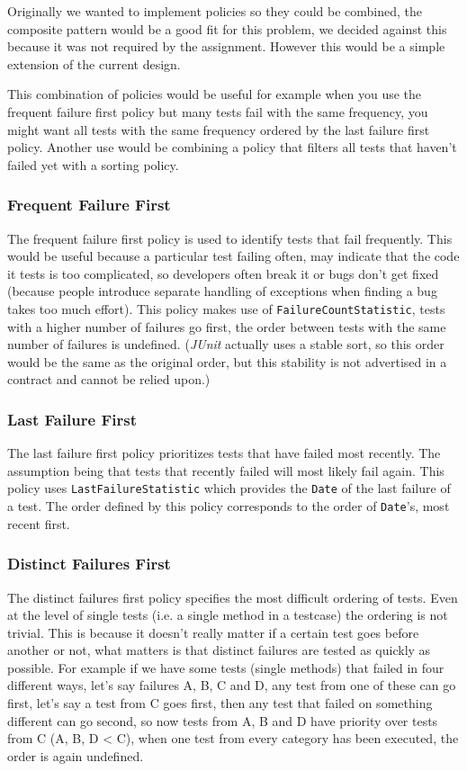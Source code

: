 \documentclass[i2]{oss}
\newcommand{\class}[1]{\texttt{#1}}
\newcommand{\junit}{\emph{JUnit }}
\begin{document}
Originally we wanted to implement policies so they could be combined,
the composite pattern would be a good fit for this problem,
we decided against this because it was not required by the assignment.
However this would be a simple extension of the current design.

This combination of policies would be useful for example when you use
the frequent failure first policy but many tests fail with the
same frequency, you might want all tests with the same frequency ordered
by the last failure first policy.
Another use would be combining a policy that filters all tests that 
haven't failed yet with a sorting policy.

\subsubsection{Frequent Failure First}

The frequent failure first policy is used to identify tests that fail
frequently.
This would be useful because a particular test failing often, may 
indicate that the code it tests is too complicated, so developers often 
break it or bugs don't get fixed (because people introduce separate 
handling of exceptions when finding a bug takes too much effort).
This policy makes use of \class{FailureCountStatistic}, tests with a 
higher number of failures go first, the order between tests with the same 
number of failures is undefined.
(\junit actually uses a stable sort, so this order would be the same as 
the original order, but this stability is not advertised in a contract 
and cannot be relied upon.)

\subsubsection{Last Failure First}

The last failure first policy prioritizes tests that have failed most 
recently.
The assumption being that tests that recently failed will most likely fail
again.
This policy uses \class{LastFailureStatistic} which provides the 
\class{Date} of the last failure of a test.
The order defined by this policy corresponds to the order of 
\class{Date}'s, most recent first.

\subsubsection{Distinct Failures First}

The distinct failures first policy specifies the most difficult 
ordering of tests.
Even at the level of single tests (i.e. a single method in a testcase)
the ordering is not trivial.
This is because it doesn't really matter if a certain test goes before 
another or not, what matters is that distinct failures are tested as 
quickly as possible.
For example if we have some tests (single methods) that failed in four
different ways, let's say failures A, B, C and D, any test from 
one of these can go first, let's say a test from C goes first, then 
any test that failed on something different can go second, so now 
tests from A, B and D have priority over tests from C (A, B, D < C), 
when one test from every category has been executed, the order is again 
undefined.
\end{document}
